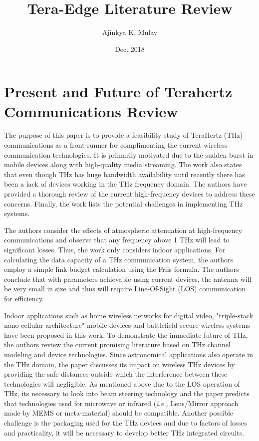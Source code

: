 \documentclass[12pt, letterpaper]{article}
\title{Tera-Edge Literature Review}
\author{Ajinkya K. Mulay}
\date{Dec. 2018}
\begin{document}
	\begin{titlepage}
		\maketitle
	\end{titlepage}
	
	\section{Present and Future of Terahertz Communications Review}
\par
The purpose of this paper is to provide a feasibility study of TeraHertz (THz) communications as a front-runner for complimenting the current wireless communication technologies. It is primarily motivated due to the sudden burst in mobile devices along with high-quality media streaming. The work also states that even though THz has huge bandwidth availability until recently there has been a lack of devices working in the THz frequency domain. The authors have provided a thorough review of the current high-frequency devices to address these concerns. Finally, the work lists the potential challenges in implementing THz systems.
\par
The authors consider the effects of atmospheric attenuation at high-frequency communications and observe that any frequency above 1 THz will lead to significant losses.  Thus, the work only considers indoor applications. For calculating the data capacity of a THz communication system, the authors employ a simple link budget calculation using the Friis formula. The authors conclude that with parameters achievable using current devices, the antenna will be very small in size and thus will require Line-Of-Sight (LOS) communication for efficiency. 
\par
Indoor applications such as home wireless networks for digital video, "triple-stack nano-cellular architecture" mobile devices and battlefield secure wireless systems have been proposed in this work. To demonstrate the immediate future of THz, the authors review the current promising literature based on THz channel modeling and device technologies. Since astronomical applications also operate in the THz domain, the paper discusses its impact on wireless THz devices by providing the safe distances outside which the interference between these technologies will negligible. As mentioned above due to the LOS operation of THz, its necessary to look into beam steering technology and the paper predicts that technologies used for microwave or infrared (\emph{i.e.,} Lens/Mirror approach made by MEMS or meta-material) should be compatible. Another possible challenge is the packaging used for the THz devices and due to factors of losses and practicality, it will be necessary to develop better THz integrated circuits. 
\end{document}
